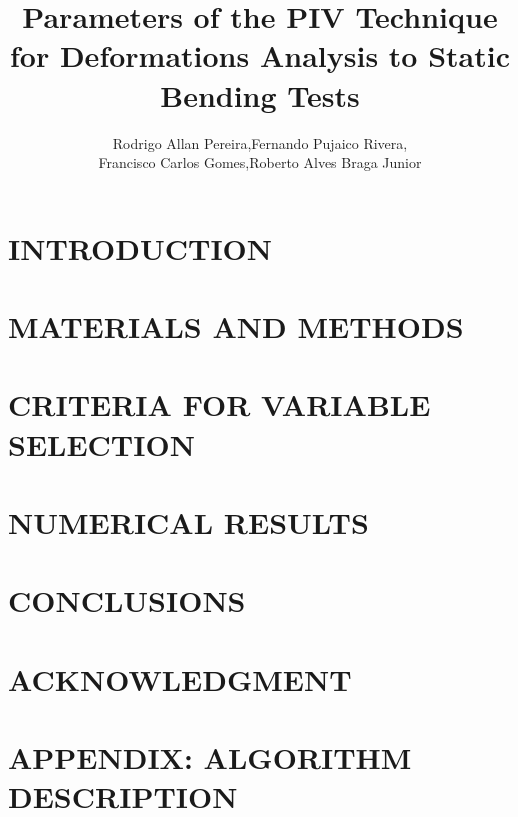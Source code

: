 \documentclass[a4paper,10pt]{article}
\title{Parameters of the PIV Technique for Deformations Analysis to Static Bending Tests}
\author{Rodrigo Allan Pereira,Fernando Pujaico Rivera,\\%
	Francisco Carlos Gomes,Roberto Alves Braga Junior%
}
\begin{document}
\maketitle


\begin{abstract}

\end{abstract}

\section{INTRODUCTION}




\section{MATERIALS AND METHODS}




\section{CRITERIA FOR VARIABLE SELECTION}
\label{sec:criteria}



\section{NUMERICAL RESULTS}




\section{CONCLUSIONS}




\section*{ACKNOWLEDGMENT}



\section{APPENDIX: ALGORITHM DESCRIPTION} 
\label{sec:algorithm}





\end{document}
